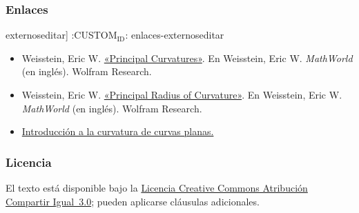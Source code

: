 \documentclass[11pt]{article}
\begin{document}
\subsubsection{Enlaces}
\label{sec:org76d22f8}
externoseditar]
:CUSTOM\(_{\text{ID}}\): enlaces-externoseditar

\begin{itemize}
\item Weisstein, Eric W.
\href{http://mathworld.wolfram.com/PrincipalCurvatures.html}{«Principal Curvatures»}. En Weisstein, Eric W. \emph{MathWorld}
(en inglés). Wolfram Research. 
\item Weisstein, Eric W.
\href{http://mathworld.wolfram.com/PrincipalRadiusofCurvature.html}{«Principal Radius of Curvature»}. En Weisstein, Eric W.
\emph{MathWorld} (en inglés).
Wolfram Research. 
\item \href{http://proyectodescartes.org/uudd/materiales\_didacticos/curvatura-JS/index.htm}{Introducción a la curvatura de curvas planas.}
\end{itemize}

\subsubsection{Licencia}
\label{sec:orgad53468}

El texto está disponible bajo la
\href{https://es.wikipedia.org/wiki/Wikipedia:Texto\_de\_la\_Licencia\_Creative\_Commons\_Atribuci\%C3\%B3n-CompartirIgual\_3.0\_Unported}{Licencia Creative Commons Atribución Compartir Igual 3.0};
pueden aplicarse cláusulas adicionales.
\end{document}
